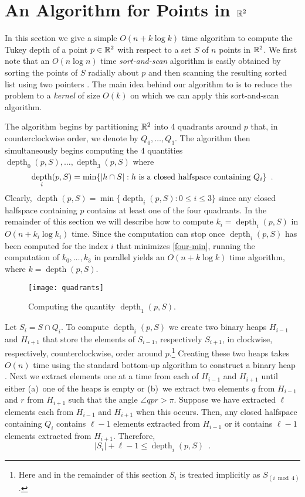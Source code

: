 \documentclass[12pt]{article}
\DeclareMathOperator{\td}{depth}
\begin{document}
\section{An Algorithm for Points in $\mathbb{R}^2$}

In this section we give a simple $O(n + k\log k)$ time algorithm to
compute the Tukey depth of a point $p\in\mathbb{R}^2$ with respect to a set
$S$ of $n$ points in $\mathbb{R}^2$.  We first note that an $O(n\log n)$ time
\emph{sort-and-scan} algorithm is easily obtained by sorting the
points of $S$ radially about $p$ and then scanning the resulting
sorted list using two pointers \cite{m91}.  The main idea behind our
algorithm to is to reduce the problem to a \emph{kernel} of size
$O(k)$ on which we can apply this sort-and-scan algorithm.

The algorithm begins by partitioning $\mathbb{R}^2$ into 4 quadrants around
$p$ that, in counterclockwise order, we denote by $Q_0,\ldots,Q_3$.
The algorithm then simultaneously begins computing the 4 quantities
$\td_0(p,S),\ldots,\td_3(p,S)$ where 
\begin{equation}
     \td_i(p,S) = \min\{|h\cap S| : \mbox{$h$ is a closed halfspace containing $Q_i$} \} \enspace . \eqlabel{four-min}
\end{equation}
Clearly, $\td(p,S) = \min\{\td_i(p,S): 0\le i \le 3 \}$ since any
closed halfspace containing $p$ contains at least one of the four quadrants.
In the remainder of this section we will describe how to compute
$k_i=\td_i(p,S)$ in $O(n + k_i\log k_i)$ time.  Since the
computation can stop once $\td_i(p,S)$ has been computed for
the index $i$ that minimizes \eqref{four-min}, running the computation
of $k_0,\ldots,k_3$ in parallel yields an $O(n +
k\log k)$ time algorithm, where $k=\td(p,S)$.

\begin{figure}
\begin{center} \texttt{[image: quadrants]} \end{center}
\caption{Computing the quantity $\td_1(p,S)$.}
\end{figure}


Let $S_i=S\cap Q_i$. To compute $\td_i(p,S)$ we create two binary
heaps $H_{i-1}$ and $H_{i+1}$ that store the elements of $S_{i-1}$,
respectively $S_{i+1}$, in clockwise, respectively, counterclockwise,
order around $p$.\footnote{Here and in the remainder of this section
$S_i$ is treated implicitly as $S_{(i\bmod 4)}$.} 
Creating these two heaps takes $O(n)$ time using the
standard bottom-up algorithm to construct a binary heap
\cite[Chapter~6]{clrs01}.
Next we extract elements one at a time from each of $H_{i-1}$ and
$H_{i+1}$ until either (a)~one of the heaps is empty or (b)~we extract
two elements $q$ from $H_{i-1}$ and $r$ from $H_{i+1}$ such that the
angle $\angle qpr > \pi$.  Suppose we have extracted $\ell$ elements
each from $H_{i-1}$ and $H_{i+1}$ when this occurs.  
Then, any closed halfspace containing $Q_i$ contains $\ell-1$
elements extracted from $H_{i-1}$ or it contains $\ell-1$ elements
extracted from $H_{i+1}$.  Therefore,
\[  
  |S_i| + \ell - 1 \le \td_i(p,S) \enspace .
\]
\end{document}
